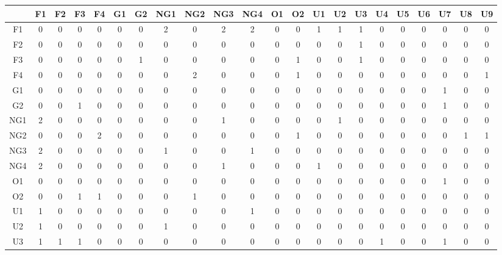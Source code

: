 \documentclass[8pt]{beamer}
\begin{document}
\begin{frame}[fragile]
\begin{columns}[c]
\begin{minipage}[c][.5\textheight][c]{\linewidth}
{\tiny
\setlength{\tabcolsep}{1pt}
\begin{table}
\begin{tabular}{c|ccccccccccccccccccccc}
\bottomrule
    & F1  & F2 & F3 & F4 & G1 & G2 & NG1 & NG2 & NG3 & NG4 & O1 & O2 & U1 & U2 & U3 & U4 & U5 & U6 & U7 & U8 & U9 \\
\hline
F1  & 0  & 0  & 0  & 0  & 0  & 0   & 2   & 0   & 2   & 2  & 0  & 0  & 1  & 1  & 1  & 0  & 0  & 0  & 0  & 0  & 0 \\
F2  & 0  & 0  & 0  & 0  & 0  & 0   & 0   & 0   & 0   & 0  & 0  & 0  & 0  & 0  & 1  & 0  & 0  & 0  & 0  & 0  & 0 \\
F3  & 0  & 0  & 0  & 0  & 0  & 1   & 0   & 0   & 0   & 0  & 0  & 1  & 0  & 0  & 1  & 0  & 0  & 0  & 0  & 0  & 0 \\
F4  & 0  & 0  & 0  & 0  & 0  & 0   & 0   & 2   & 0   & 0  & 0  & 1  & 0  & 0  & 0  & 0  & 0  & 0  & 0  & 0  & 1 \\
G1  & 0  & 0  & 0  & 0  & 0  & 0   & 0   & 0   & 0   & 0  & 0  & 0  & 0  & 0  & 0  & 0  & 0  & 0  & 1  & 0  & 0 \\
G2  & 0  & 0  & 1  & 0  & 0  & 0   & 0   & 0   & 0   & 0  & 0  & 0  & 0  & 0  & 0  & 0  & 0  & 0  & 1  & 0  & 0 \\
NG1 & 2  & 0  & 0  & 0  & 0  & 0   & 0   & 0   & 1   & 0  & 0  & 0  & 0  & 1  & 0  & 0  & 0  & 0  & 0  & 0  & 0 \\
NG2 & 0  & 0  & 0  & 2  & 0  & 0   & 0   & 0   & 0   & 0  & 0  & 1  & 0  & 0  & 0  & 0  & 0  & 0  & 0  & 1  & 1 \\
NG3 & 2  & 0  & 0  & 0  & 0  & 0   & 1   & 0   & 0   & 1  & 0  & 0  & 0  & 0  & 0  & 0  & 0  & 0  & 0  & 0  & 0 \\
NG4 & 2  & 0  & 0  & 0  & 0  & 0   & 0   & 0   & 1   & 0  & 0  & 0  & 1  & 0  & 0  & 0  & 0  & 0  & 0  & 0  & 0 \\
O1  & 0  & 0  & 0  & 0  & 0  & 0   & 0   & 0   & 0   & 0  & 0  & 0  & 0  & 0  & 0  & 0  & 0  & 0  & 1  & 0  & 0 \\
O2  & 0  & 0  & 1  & 1  & 0  & 0   & 0   & 1   & 0   & 0  & 0  & 0  & 0  & 0  & 0  & 0  & 0  & 0  & 0  & 0  & 0 \\
U1  & 1  & 0  & 0  & 0  & 0  & 0   & 0   & 0   & 0   & 1  & 0  & 0  & 0  & 0  & 0  & 0  & 0  & 0  & 0  & 0  & 0 \\
U2  & 1  & 0  & 0  & 0  & 0  & 0   & 1   & 0   & 0   & 0  & 0  & 0  & 0  & 0  & 0  & 0  & 0  & 0  & 0  & 0  & 0 \\
U3  & 1  & 1  & 1  & 0  & 0  & 0   & 0   & 0   & 0   & 0  & 0  & 0  & 0  & 0  & 0  & 1  & 0  & 0  & 1  & 0  & 0 \\

\end{tabular}
\end{table}}
\end{minipage}
\end{columns}
\end{frame}
\end{document}
